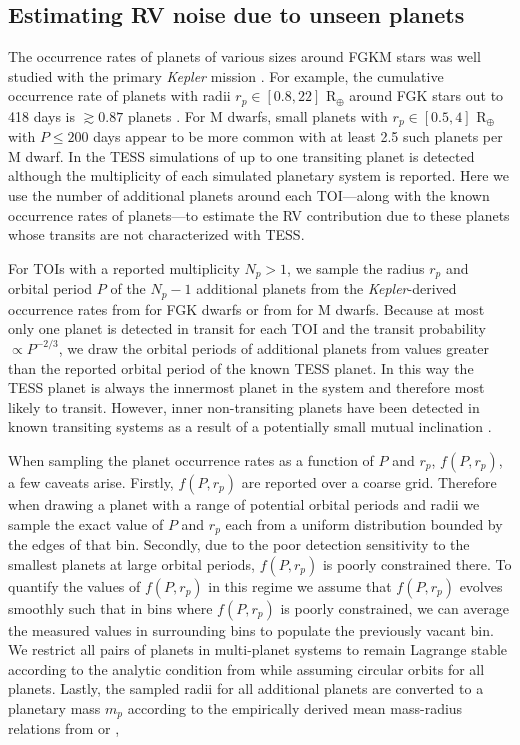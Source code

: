 \subsection{Estimating RV noise due to unseen planets} \label{sect:planets}
The occurrence rates of planets of various sizes around FGKM stars was well studied with the primary
\emph{Kepler} mission \citep[e.g.][]{fressin13, dressing15a}. For example, the cumulative occurrence rate of planets with
radii $r_p \in [0.8,22]$ R$_{\oplus}$ around FGK stars out to 418 days is $\gtrsim 0.87$ planets \citep{fressin13}.
For M dwarfs, small planets with $r_p \in [0.5,4]$ R$_{\oplus}$ with $P \leq 200$ days appear to be more common with
at least 2.5 such planets per
M dwarf. In the TESS simulations of  up to one transiting planet is detected although the
multiplicity of each simulated planetary system is reported.
Here we use the number of additional planets around each TOI---along with the known occurrence rates of
planets---to estimate the RV contribution due to these planets whose transits
are not characterized with TESS.

For TOIs with a reported multiplicity $N_p>1$, we sample the radius $r_p$ and orbital period $P$ of the $N_p-1$
additional planets from the \emph{Kepler}-derived occurrence rates from \cite{fressin13} for FGK dwarfs or from
\cite{dressing15a} for M dwarfs. Because at most only one planet is detected in transit for each TOI and the
transit probability $\propto P^{-2/3}$, we draw the orbital periods of additional planets from values greater than
the reported orbital period of the known TESS planet.
In this way the TESS planet is always the innermost planet in the system and therefore most likely to transit.
However, inner non-transiting planets have been detected in known transiting systems
as a result of a potentially small mutual inclination \citep[$\Delta i \sim 1^{\circ}$;][]{cloutier17b}.

When sampling the planet occurrence rates as a function of $P$ and $r_p$, $f(P,r_p)$, a few caveats arise. Firstly,
$f(P,r_p)$ are reported over a coarse grid. Therefore when drawing a planet with a range of potential orbital
periods and radii we sample the exact value of $P$ and $r_p$ each from a uniform distribution bounded by the edges
of that bin. Secondly, due to the poor detection sensitivity to the smallest planets at large orbital periods,
$f(P,r_p)$ is poorly constrained there. To quantify the values of $f(P,r_p)$ in this regime we assume that
$f(P,r_p)$ evolves smoothly such that in bins where $f(P,r_p)$ is poorly constrained, we can average the measured
values in surrounding bins to populate the previously vacant bin. We restrict all pairs of planets in multi-planet
systems to remain Lagrange stable according to the analytic condition from \cite{barnes06} while assuming circular
orbits for all planets. Lastly, the sampled radii for all additional planets are converted to a planetary mass
$m_p$ according to the empirically derived mean mass-radius relations from \cite{weiss13} or \cite{weiss14},

